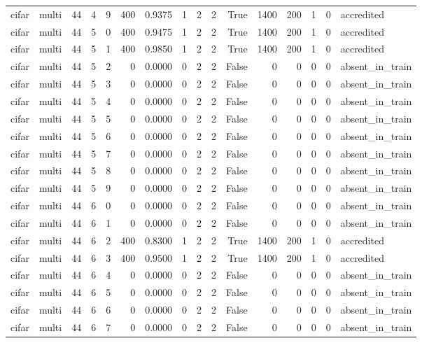 \begin{tabular}{llrrrrrrrrrrrrrl}
cifar & multi & 44 & 4 & 9 & 400 & 0.9375 & 1 & 2 & 2 & True & 1400 & 200 & 1 & 0 & accredited \\
cifar & multi & 44 & 5 & 0 & 400 & 0.9475 & 1 & 2 & 2 & True & 1400 & 200 & 1 & 0 & accredited \\
cifar & multi & 44 & 5 & 1 & 400 & 0.9850 & 1 & 2 & 2 & True & 1400 & 200 & 1 & 0 & accredited \\
cifar & multi & 44 & 5 & 2 & 0 & 0.0000 & 0 & 2 & 2 & False & 0 & 0 & 0 & 0 & absent\_in\_train \\
cifar & multi & 44 & 5 & 3 & 0 & 0.0000 & 0 & 2 & 2 & False & 0 & 0 & 0 & 0 & absent\_in\_train \\
cifar & multi & 44 & 5 & 4 & 0 & 0.0000 & 0 & 2 & 2 & False & 0 & 0 & 0 & 0 & absent\_in\_train \\
cifar & multi & 44 & 5 & 5 & 0 & 0.0000 & 0 & 2 & 2 & False & 0 & 0 & 0 & 0 & absent\_in\_train \\
cifar & multi & 44 & 5 & 6 & 0 & 0.0000 & 0 & 2 & 2 & False & 0 & 0 & 0 & 0 & absent\_in\_train \\
cifar & multi & 44 & 5 & 7 & 0 & 0.0000 & 0 & 2 & 2 & False & 0 & 0 & 0 & 0 & absent\_in\_train \\
cifar & multi & 44 & 5 & 8 & 0 & 0.0000 & 0 & 2 & 2 & False & 0 & 0 & 0 & 0 & absent\_in\_train \\
cifar & multi & 44 & 5 & 9 & 0 & 0.0000 & 0 & 2 & 2 & False & 0 & 0 & 0 & 0 & absent\_in\_train \\
cifar & multi & 44 & 6 & 0 & 0 & 0.0000 & 0 & 2 & 2 & False & 0 & 0 & 0 & 0 & absent\_in\_train \\
cifar & multi & 44 & 6 & 1 & 0 & 0.0000 & 0 & 2 & 2 & False & 0 & 0 & 0 & 0 & absent\_in\_train \\
cifar & multi & 44 & 6 & 2 & 400 & 0.8300 & 1 & 2 & 2 & True & 1400 & 200 & 1 & 0 & accredited \\
cifar & multi & 44 & 6 & 3 & 400 & 0.9500 & 1 & 2 & 2 & True & 1400 & 200 & 1 & 0 & accredited \\
cifar & multi & 44 & 6 & 4 & 0 & 0.0000 & 0 & 2 & 2 & False & 0 & 0 & 0 & 0 & absent\_in\_train \\
cifar & multi & 44 & 6 & 5 & 0 & 0.0000 & 0 & 2 & 2 & False & 0 & 0 & 0 & 0 & absent\_in\_train \\
cifar & multi & 44 & 6 & 6 & 0 & 0.0000 & 0 & 2 & 2 & False & 0 & 0 & 0 & 0 & absent\_in\_train \\
cifar & multi & 44 & 6 & 7 & 0 & 0.0000 & 0 & 2 & 2 & False & 0 & 0 & 0 & 0 & absent\_in\_train \\

\end{tabular}
